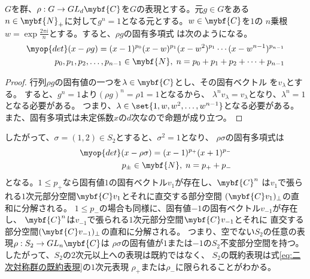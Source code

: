 	\begin{proposition}[べき乗]\label{prop:べき乗} %
		$G$を群、$\rho:G\to GL_d\mybf{C}$を$G$の表現とする。元$g\in G$をある
		$n\in\mybf{N}_+$に対して$g^n=1$となる元とする。$w\in\mybf{C}$を$1$の
		$n$乗根$w=\exp \frac{2\pi i}{n}$とする。すると、$\rho g$の固有多項式
		は次のようになる。
		\begin{equation*}\begin{split} %
			\myop{det}(x-\rho g) = (x-1)^{p_0}(x-w)^{p_1}(x-w^2)^{p_1}
			\cdots(x-w^{n-1})^{p_{n-1}} \\
			p_0,p_1,p_2,\dots,p_{n-1}\in\mybf{N}
			,\; n = p_0+p_1+p_2+\cdots+p_{n-1}
		\end{split}\end{equation*} %
	\end{proposition} %
	\begin{proof} %
		行列$\rho g$の固有値の一つを$\lambda\in\mybf{C}$とし、その固有ベクトル
		を$v_\lambda$とする。
		すると、$g^n=1$より$(\rho g)^n=\rho 1=1$となるから、
		$\lambda^nv_\lambda=v_\lambda$となり、$\lambda^n=1$となる必要がある。
		つまり、$\lambda\in\set{1,w,w^2,\dots,w^{n-1}}$となる必要がある。
		また、固有多項式は未定係数$x$の$d$次なので命題が成り立つ。
	\end{proof} %

	したがって、$\sigma=(1,2)\in S_2$とすると、$\sigma^2=1$となり、
	$\rho\sigma$の固有多項式は
	\begin{equation}\label{eq:互換の固有多項式}\begin{split} %
		\myop{det}(x-\rho\sigma) = (x-1)^{p_+}(x+1)^{p_-} \\
		p_\pm\in\mybf{N},\; n = p_+ + p_- \\
	\end{split}\end{equation} %
	となる。$1\le p_+$なら固有値$1$の固有ベクトル$v_1$が存在し、$\mybf{C}^n$
	は$v_1$で張られる$1$次元部分空間$\mybf{C}v_1$とそれに直交する部分空間
	$(\mybf{C}v_1)_\perp$の直和に分解される。
	$1\le p_-$の場合も同様に、固有値$-1$の固有ベクトル$v_{-1}$が存在し、
	$\mybf{C}^n$は$v_{-1}$で張られる$1$次元部分空間$\mybf{C}v_{-1}$とそれに
	直交する部分空間$(\mybf{C}v_{-1})_\perp$の直和に分解される。
	つまり、空でない$S_2$の任意の表現$\rho:S_2\to GL_n\mybf{C}$は
	$\rho\sigma$の固有値が$1$または$-1$の$S_2$不変部分空間を持つ。
	したがって、$S_2$の$2$次元以上への表現は既約ではなく、
	$S_2$の既約表現は式\eqref{eq:二次対称群の既約表現}の$1$次元表現
	$\rho_+$または$\rho_-$に限られることがわかる。

